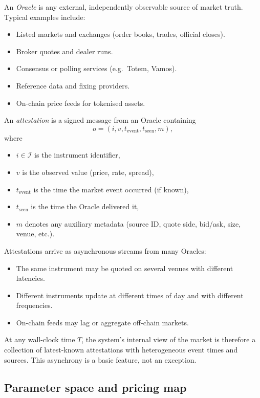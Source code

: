 \documentclass[11pt,a4paper]{article}
\begin{document}
An \textit{Oracle} is any external, independently observable source of market truth. Typical examples include:
\begin{itemize}
    \item Listed markets and exchanges (order books, trades, official closes).
    \item Broker quotes and dealer runs.
    \item Consensus or polling services (e.g.\ Totem, Vamos).
    \item Reference data and fixing providers.
    \item On-chain price feeds for tokenised assets.
\end{itemize}

An \textit{attestation} is a signed message from an Oracle containing
\[
    o = (i, v, t_{\text{event}}, t_{\text{seen}}, m),
\]
where
\begin{itemize}
    \item $i \in \mathcal{I}$ is the instrument identifier,
    \item $v$ is the observed value (price, rate, spread),
    \item $t_{\text{event}}$ is the time the market event occurred (if known),
    \item $t_{\text{seen}}$ is the time the Oracle delivered it,
    \item $m$ denotes any auxiliary metadata (source ID, quote side, bid/ask, size, venue, etc.).
\end{itemize}

Attestations arrive as asynchronous streams from many Oracles:
\begin{itemize}
    \item The same instrument may be quoted on several venues with different latencies.
    \item Different instruments update at different times of day and with different frequencies.
    \item On-chain feeds may lag or aggregate off-chain markets.
\end{itemize}

At any wall-clock time $T$, the system's internal view of the market is therefore a collection of latest-known attestations with heterogeneous event times and sources. This asynchrony is a basic feature, not an exception.

\subsection{Parameter space and pricing map}
\end{document}
